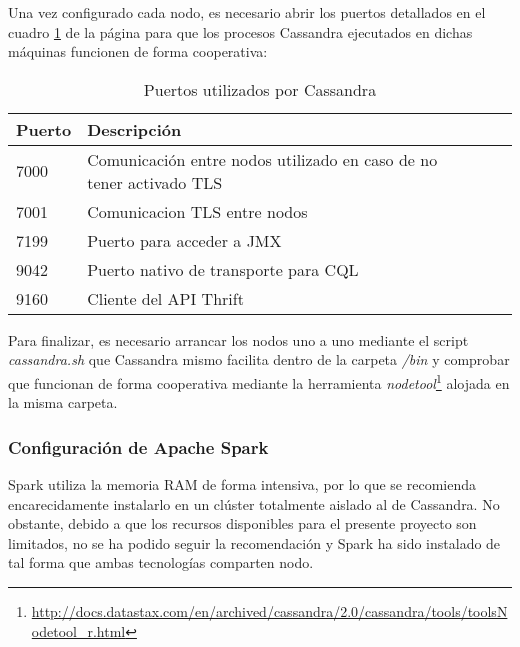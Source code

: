 Una vez configurado cada nodo, es necesario abrir los puertos detallados en el cuadro \ref{puertos-cassandra} de la página \pageref{puertos-cassandra} para que los procesos Cassandra ejecutados en dichas máquinas funcionen de forma cooperativa:

\begin{table}[h!]
	\centering
	\begin{tabular}{|l||l|l|l|}
		
		\hline
		
		\textbf{Puerto} & \textbf{Descripción} \\
		
		\hline
		\hline
		
		7000 & Comunicación entre nodos utilizado en caso de no tener activado TLS \\
		
		\hline
		
		7001 & Comunicacion TLS entre nodos \\
		
		\hline
		
		7199 & Puerto para acceder a JMX \\ 
		
		\hline
		
		9042 & Puerto nativo de transporte para CQL \\
		
		\hline
		
		9160 & Cliente del API Thrift \\
		
		\hline
		
	\end{tabular}
	\caption{Puertos utilizados por Cassandra}
	\label{puertos-cassandra}
\end{table}

Para finalizar, es necesario arrancar los nodos uno a uno mediante el script \textit{cassandra.sh} que Cassandra mismo facilita dentro de la carpeta \textit{/bin} y comprobar que funcionan de forma cooperativa mediante la herramienta \textit{nodetool}\footnote{\url{http://docs.datastax.com/en/archived/cassandra/2.0/cassandra/tools/toolsNodetool_r.html}} alojada en la misma carpeta. 

\subsubsection{Configuración de Apache Spark}

Spark utiliza la memoria RAM de forma intensiva, por lo que se recomienda encarecidamente instalarlo en un clúster totalmente aislado al de Cassandra. No obstante, debido a que los recursos disponibles para el presente proyecto son limitados, no se ha podido seguir la recomendación y Spark ha sido instalado de tal forma que ambas tecnologías comparten nodo.\\

